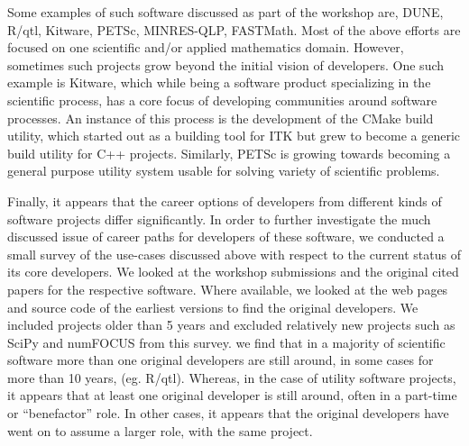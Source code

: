 \documentclass[11pt, oneside]{amsart}
\newcommand{\toolname}[1] {\textsf{#1}}
\begin{document}
Some examples of such software discussed as part of the workshop are,
\toolname{DUNE}, \toolname{R/qtl}, \toolname{Kitware}, \toolname{PETSc}, \toolname{MINRES-QLP},
\toolname{FASTMath}.  Most of the above efforts are focused on one scientific
and/or applied mathematics domain. However, sometimes such projects grow beyond
the initial vision of developers. One such example is \toolname{Kitware}, which
while being a software product specializing in the scientific process, has a
core focus of developing communities around software processes. An instance of
this process is the development of the \toolname{CMake} build utility, which
started out as a building tool for \toolname{ITK} but grew to become a generic
build utility for C++ projects. Similarly, \toolname{PETSc} is growing towards
becoming a general purpose utility system usable for solving variety of
scientific problems.

Finally, it appears that the career options of developers from different kinds
of software projects differ significantly. In order to further investigate the
much discussed issue of career paths for developers of these software, we
conducted a small survey of the use-cases discussed above with respect to the
current status of its core developers. We looked at the workshop submissions
and the original cited papers for the respective software. Where available, we
looked at the web pages and source code of the earliest versions to find the
original developers. We included projects older than 5 years and excluded
relatively new projects such as \toolname{SciPy} and \toolname{numFOCUS} from
this survey. we find that in a majority of scientific software more than one
original developers are still around, in some cases for more than 10 years,
(eg. \toolname{R/qtl}).  Whereas, in the case of utility software projects, it
appears that at least one original developer is still around, often in a
part-time or ``benefactor'' role. In other cases, it appears that the original
developers have went on to assume a larger role, with the same project.
\end{document}
